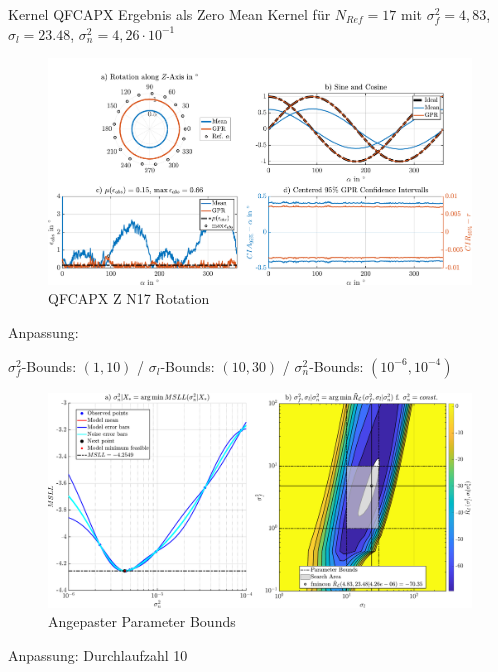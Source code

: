 Kernel QFCAPX Ergebnis als Zero Mean Kernel für $N_{Ref} = 17$ mit $\sigma_f^2 = 4,83$, $\sigma_l = 23.48$, $\sigma_n^2 = 4,26\cdot10^{-1}$


\begin{figure}[tbph]
	\centering
	\includegraphics[width=\linewidth]{appendix/images/8-Ergebnisse-Experimente/QFCAPX-Z-N17-Rotation}
	\caption[QFCAPX Z N17 Rotation]{QFCAPX Z N17 Rotation}
	\label{fig:qfcapx-z-n17-rotation}
\end{figure}


Anpassung:

$\sigma_f^2$-Bounds: $(1, 10)$ / $\sigma_l$-Bounds: $(10, 30)$ / $\sigma_n^2$-Bounds: $(10^{-6}, 10^{-4})$


\begin{figure}
	\centering
	\includegraphics[width=\linewidth]{appendix/images/8-Ergebnisse-Experimente/QFCAPX-Z-N17-Bounds}
	\caption[Angepaster Parameter Bounds]{Angepaster Parameter Bounds}
	\label{fig:qfcapx-z-n17-bounds}
\end{figure}


Anpassung: Durchlaufzahl 10


